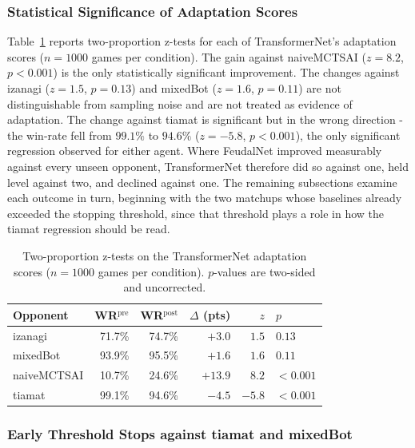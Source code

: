 \documentclass[sigconf,review=false]{acmart}
\begin{document}
\subsubsection{Statistical Significance of Adaptation Scores}

Table~\ref{tab:transformernet-significance} reports two-proportion z-tests for each of TransformerNet's adaptation scores ($n = 1000$ games per condition). 
The gain against naiveMCTSAI ($z = 8.2$, $p < 0.001$) is the only statistically significant improvement. 
The changes against izanagi ($z = 1.5$, $p = 0.13$) and mixedBot ($z = 1.6$, $p = 0.11$) are not distinguishable from sampling noise and are not treated as evidence of adaptation. 
The change against tiamat is significant but in the wrong direction - the win-rate fell from $99.1\%$ to $94.6\%$ ($z = -5.8$, $p < 0.001$), the only significant regression observed for either agent. 
Where FeudalNet improved measurably against every unseen opponent, TransformerNet therefore did so against one, held level against two, and declined against one. The remaining subsections examine each outcome in turn, beginning with the two matchups whose baselines already exceeded the stopping threshold, since that threshold plays a role in how the tiamat regression should be read.

\begin{table}[t]
  \caption{Two-proportion z-tests on the TransformerNet adaptation scores ($n = 1000$ games per condition). $p$-values are two-sided and uncorrected.}
  \label{tab:transformernet-significance}
  \begin{tabular}{lrrrrl}
    \toprule
    Opponent & WR$^{\mathrm{pre}}$ & WR$^{\mathrm{post}}$
             & $\Delta$ (pts) & $z$ & $p$ \\
    \midrule
    izanagi     & 71.7\% & 74.7\% &  $+3.0$ &  $1.5$ & $0.13$ \\
    mixedBot    & 93.9\% & 95.5\% &  $+1.6$ &  $1.6$ & $0.11$ \\
    naiveMCTSAI & 10.7\% & 24.6\% & $+13.9$ &  $8.2$ & $<0.001$ \\
    tiamat      & 99.1\% & 94.6\% &  $-4.5$ & $-5.8$ & $<0.001$ \\
    \bottomrule
  \end{tabular}
\end{table}

\subsubsection{Early Threshold Stops against tiamat and mixedBot}
\end{document}
